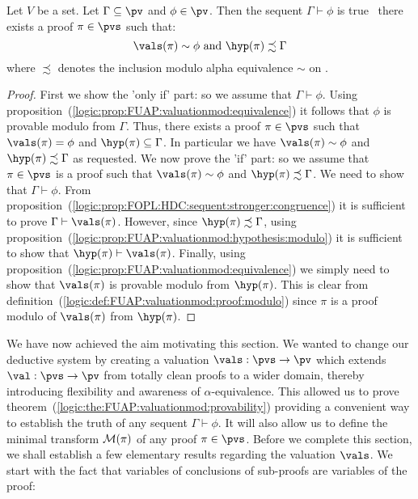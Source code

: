 \begin{theorem}\label{logic:the:FUAP:valuationmod:provability}
Let $V$ be a set. Let $\Gamma\subseteq\pv$ and $\phi\in\pv$. Then
the sequent $\Gamma\vdash\phi$ is true \ifand\ there exists a proof
$\pi\in\pvs$ such that:
    \[
    \vals(\pi)\sim\phi\mbox{\ and\ }\hyp(\pi)\precsim\Gamma
    \]
where $\precsim$ denotes the inclusion modulo alpha equivalence $\sim$ on \pv.
\end{theorem}
\begin{proof}
First we show the 'only if' part: so we assume that
$\Gamma\vdash\phi$. Using
proposition~(\ref{logic:prop:FUAP:valuationmod:equivalence}) it
follows that $\phi$ is provable modulo from $\Gamma$. Thus, there
exists a proof $\pi\in\pvs$ such that $\vals(\pi)=\phi$ and
$\hyp(\pi)\subseteq\Gamma$. In particular we have
$\vals(\pi)\sim\phi$ and $\hyp(\pi)\precsim\Gamma$ as requested. We
now prove the 'if' part: so we assume that $\pi\in\pvs$ is a proof
such that $\vals(\pi)\sim\phi$ and $\hyp(\pi)\precsim\Gamma$. We
need to show that $\Gamma\vdash\phi$. From
proposition~(\ref{logic:prop:FOPL:HDC:sequent:stronger:congruence})
it is sufficient to prove $\Gamma\vdash\vals(\pi)$. However, since
$\hyp(\pi)\precsim\Gamma$, using
proposition~(\ref{logic:prop:FUAP:valuationmod:hypothesis:modulo})
it is sufficient to show that $\hyp(\pi)\vdash\vals(\pi)$. Finally,
using proposition~(\ref{logic:prop:FUAP:valuationmod:equivalence})
we simply need to show that $\vals(\pi)$ is provable modulo from
$\hyp(\pi)$. This is clear from
definition~(\ref{logic:def:FUAP:valuationmod:proof:modulo}) since
$\pi$ is a proof modulo of $\vals(\pi)$ from $\hyp(\pi)$.
\end{proof}

We have now achieved the  aim motivating this section. We wanted to
change our deductive system by creating a valuation
$\vals:\pvs\to\pv$ which extends $\val:\pvs\to\pv$ from totally
clean proofs to a wider domain, thereby introducing flexibility and
awareness of $\alpha$-equivalence. This allowed us to prove
theorem~(\ref{logic:the:FUAP:valuationmod:provability}) providing a
convenient way to establish the truth of any sequent
$\Gamma\vdash\phi$. It will also allow us to define the minimal
transform ${\cal M}(\pi)$ of any proof $\pi\in\pvs$. Before we
complete this section, we shall establish a few elementary results
regarding the valuation $\vals$. We start with the fact that
variables of conclusions of sub-proofs are variables of the proof:

